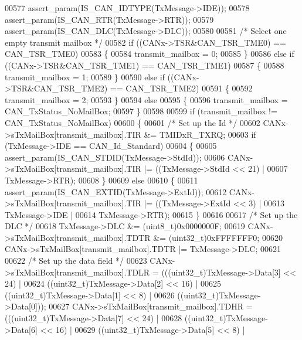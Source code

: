 \begin{DoxyCode}
00577   assert_param(IS\_CAN\_IDTYPE(TxMessage->IDE));
00578   assert_param(IS\_CAN\_RTR(TxMessage->RTR));
00579   assert_param(IS\_CAN\_DLC(TxMessage->DLC));
00580 
00581   \textcolor{comment}{/* Select one empty transmit mailbox */}
00582   \textcolor{keywordflow}{if} ((CANx->TSR&CAN_TSR_TME0) == CAN_TSR_TME0)
00583   \{
00584     transmit\_mailbox = 0;
00585   \}
00586   \textcolor{keywordflow}{else} \textcolor{keywordflow}{if} ((CANx->TSR&CAN_TSR_TME1) == CAN_TSR_TME1)
00587   \{
00588     transmit\_mailbox = 1;
00589   \}
00590   \textcolor{keywordflow}{else} \textcolor{keywordflow}{if} ((CANx->TSR&CAN_TSR_TME2) == CAN_TSR_TME2)
00591   \{
00592     transmit\_mailbox = 2;
00593   \}
00594   \textcolor{keywordflow}{else}
00595   \{
00596     transmit\_mailbox = CAN_TxStatus_NoMailBox;
00597   \}
00598 
00599   \textcolor{keywordflow}{if} (transmit\_mailbox != CAN_TxStatus_NoMailBox)
00600   \{
00601     \textcolor{comment}{/* Set up the Id */}
00602     CANx->sTxMailBox[transmit\_mailbox].TIR &= TMIDxR_TXRQ;
00603     \textcolor{keywordflow}{if} (TxMessage->IDE == CAN_Id_Standard)
00604     \{
00605       assert_param(IS\_CAN\_STDID(TxMessage->StdId));
00606       CANx->sTxMailBox[transmit\_mailbox].TIR |= ((TxMessage->StdId << 21) |
00607                                                   TxMessage->RTR);
00608     \}
00609     \textcolor{keywordflow}{else}
00610     \{
00611       assert_param(IS\_CAN\_EXTID(TxMessage->ExtId));
00612       CANx->sTxMailBox[transmit\_mailbox].TIR |= ((TxMessage->ExtId << 3) |
00613                                                   TxMessage->IDE |
00614                                                   TxMessage->RTR);
00615     \}
00616 
00617     \textcolor{comment}{/* Set up the DLC */}
00618     TxMessage->DLC &= (uint8\_t)0x0000000F;
00619     CANx->sTxMailBox[transmit\_mailbox].TDTR &= (uint32\_t)0xFFFFFFF0;
00620     CANx->sTxMailBox[transmit\_mailbox].TDTR |= TxMessage->DLC;
00621 
00622     \textcolor{comment}{/* Set up the data field */}
00623     CANx->sTxMailBox[transmit\_mailbox].TDLR = (((uint32\_t)TxMessage->Data[3] << 24) |
00624                                              ((uint32\_t)TxMessage->Data[2] << 16) |
00625                                              ((uint32\_t)TxMessage->Data[1] << 8) |
00626                                              ((uint32\_t)TxMessage->Data[0]));
00627     CANx->sTxMailBox[transmit\_mailbox].TDHR = (((uint32\_t)TxMessage->Data[7] << 24) |
00628                                              ((uint32\_t)TxMessage->Data[6] << 16) |
00629                                              ((uint32\_t)TxMessage->Data[5] << 8) |

\end{DoxyCode}
